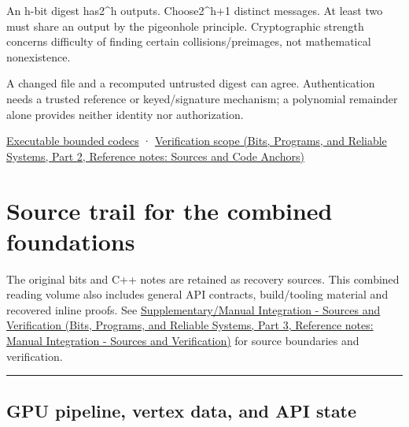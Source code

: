 \hypertarget{03-visual-computing-i-ch018-a-digest-cannot-be-injective-on-unrestricted-messages}{}

An h-bit digest has2\^{}h outputs. Choose2\^{}h+1 distinct messages. At least two must share an output by the pigeonhole principle. Cryptographic strength concerns difficulty of finding certain collisions/preimages, not mathematical nonexistence.

A changed file and a recomputed untrusted digest can agree. Authentication needs a trusted reference or keyed/signature mechanism; a polynomial remainder alone provides neither identity nor authorization.

\hyperref[appendix-4e2236f53445-representation-codecs-and-bounded-file-laboratory]{Executable bounded codecs} · \href{../01-Bits-Programs-and-Reliable-Systems-P02/main.pdf\#appendix-a103e7846d21}{Verification scope (Bits, Programs, and Reliable Systems, Part 2, Reference notes: Sources and Code Anchors)}

\section{Source trail for the combined foundations}\label{03-visual-computing-i-ch018-source-trail-for-the-combined-foundations}

\hypertarget{03-visual-computing-i-ch018-source-trail-for-the-combined-foundations}{}

The original bits and C++ notes are retained as recovery sources. This combined reading volume also includes general API contracts, build/tooling material and recovered inline proofs. See \href{../01-Bits-Programs-and-Reliable-Systems-P03/main.pdf\#appendix-3b67654799a2}{Supplementary/Manual Integration - Sources and Verification (Bits, Programs, and Reliable Systems, Part 3, Reference notes: Manual Integration - Sources and Verification)} for source boundaries and verification.

\begin{center}\rule{0.5\linewidth}{0.5pt}\end{center}

\subsection{GPU pipeline, vertex data, and API state}\label{03-visual-computing-i-ch018-gpu-pipeline-vertex-data-and-api-state}

\hypertarget{03-visual-computing-i-ch018-gpu-pipeline-vertex-data-and-api-state}{}

